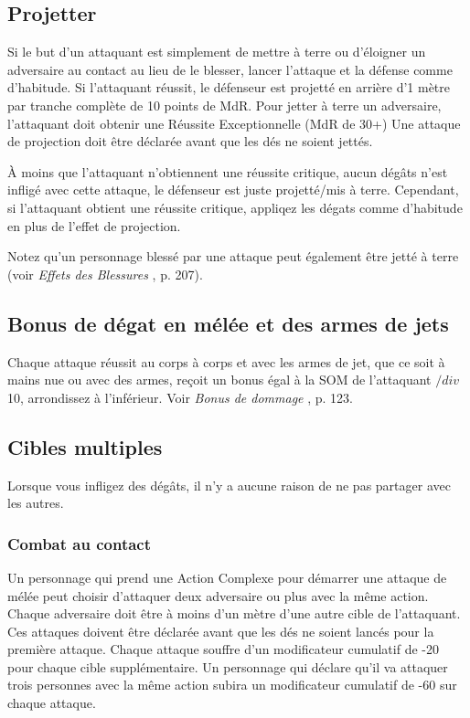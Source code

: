 \subsection{Projetter} \label{sec:knockdown-knockback} 

Si le but d'un attaquant est simplement de mettre à terre ou d'éloigner un adversaire au contact au lieu de le blesser, lancer l'attaque et la défense comme d'habitude. Si l'attaquant réussit, le défenseur est projetté en arrière d'1 mètre par tranche complète de 10 points de MdR. Pour jetter à terre un adversaire, l'attaquant doit obtenir une Réussite Exceptionnelle (MdR de 30+) Une attaque de projection doit être déclarée avant que les dés ne soient jettés. 

À moins que l'attaquant n'obtiennent une réussite critique, aucun dégâts n'est infligé avec cette attaque, le défenseur est juste projetté/mis à terre. Cependant, si l'attaquant obtient une réussite critique, appliqez les dégats comme d'habitude en plus de l'effet de projection. 

Notez qu'un personnage blessé par une attaque peut également être jetté à terre (voir \emph{Effets des Blessures }, p. 207). 

\subsection{Bonus de dégat en mélée et des armes de jets} \label{sec:melee-thrown-damage-bonus} 

Chaque attaque réussit au corps à corps et avec les armes de jet, que ce soit à mains nue ou avec des armes, reçoit un bonus égal à la SOM de l'attaquant $/div$ 10, arrondissez à l'inférieur. Voir \emph{Bonus de dommage }, p. 123. 

\subsection{Cibles multiples} \label{sec:multiple-targets} 

Lorsque vous infligez des dégâts, il n'y a aucune raison de ne pas partager avec les autres. 

\subsubsection{Combat au contact} 

Un personnage qui prend une Action Complexe pour démarrer une attaque de mélée peut choisir d'attaquer deux adversaire ou plus avec la même action. Chaque adversaire doit être à moins d'un mètre d'une autre cible de l'attaquant. Ces attaques doivent être déclarée avant que les dés ne soient lancés pour la première attaque. Chaque attaque souffre d'un modificateur cumulatif de -20 pour chaque cible supplémentaire. Un personnage qui déclare qu'il va attaquer trois personnes avec la même action subira un modificateur cumulatif de -60 sur chaque attaque. 

